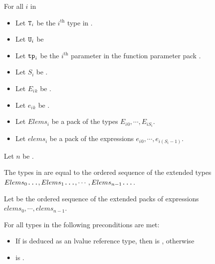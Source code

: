\documentclass{wg21}
\begin{document}
\begin{itemdescr}  %
    \pnum
    \begin{addedblock}

    For all $i$ in  
        \begin{itemize}
         \item Let $\texttt{T}_i$ be the $i^\text{th}$ type in .
         \item Let $\texttt{U}_i$ be 
         \item Let $\texttt{tp}_i$ be the $i^\text{th}$ parameter in the function parameter pack .
         \item Let $S_i$ be .
         \item Let $E_i$$_k$ be .
         \item Let $e_i$$_k$ be .
         \item Let $Elems_i$ be a pack of the types $E_i$$_0, \cdots,  E_{iS_{i}}$.
         \item Let $elems_i$ be a pack of the expressions $e_i$$_0, \cdots,  e_{i(S_{i}-1)}$.
     \end{itemize}

    Let $n$ be .

    The types in  are equal to the ordered
    sequence of the extended types \\
    $Elems_0\texttt{...} , Elems_1\texttt{...} , \cdots , Elems_{n-1}\texttt{...}$.

    Let  be the ordered sequence of the extended packs of expressions $elems_0, \cdots, elems_{n-1}$.

\mandates

    For all types  in  the following preconditions are met:
    \begin{itemize}
        \item If  is deduced as an lvalue reference type, then
         is , otherwise
        \item {}  is .
    \end{itemize}

\returns
    \end{addedblock}
    \begin{removedblock}




\end{removedblock}
\end{itemdescr}
\end{document}
